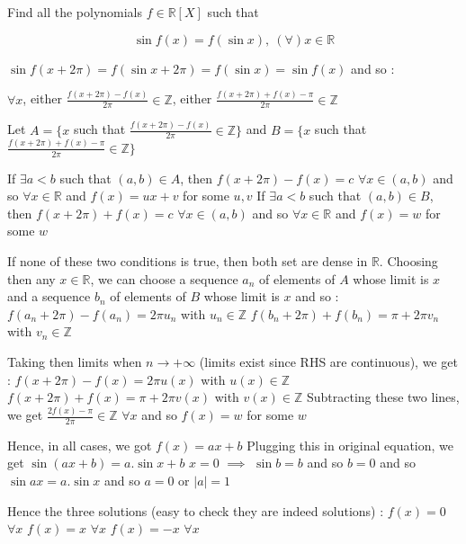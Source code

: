 \begin{solution}
	\begin{tcolorbox}Find all the polynomials $f\in \mathbb{R}[X]$ such that

\[\sin f(x)=f(\sin x),\ (\forall)x\in \mathbb{R}\]\end{tcolorbox}
$\sin f(x+2\pi)=f(\sin x+2\pi)=f(\sin x)=\sin f(x)$ and so :

$\forall x$, either $\frac{f(x+2\pi)-f(x)}{2\pi}\in\mathbb Z$, either $\frac{f(x+2\pi)+f(x)-\pi}{2\pi}\in\mathbb Z$

Let $A=\{x$ such that $\frac{f(x+2\pi)-f(x)}{2\pi}\in\mathbb Z\}$
and $B=\{x$ such that $\frac{f(x+2\pi)+f(x)-\pi}{2\pi}\in\mathbb Z\}$

If $\exists a<b$ such that $(a,b)\in A$, then $f(x+2\pi)-f(x)=c$ $\forall x\in(a,b)$ and so $\forall x\in\mathbb R$ and $f(x)=ux+v$ for some $u,v$
If $\exists a<b$ such that $(a,b)\in B$, then $f(x+2\pi)+f(x)=c$ $\forall x\in(a,b)$ and so $\forall x\in\mathbb R$ and $f(x)=w$ for some $w$

If none of these two conditions is true, then both set are dense in $\mathbb R$.
Choosing then any $x\in\mathbb R$, we can choose a sequence $a_n$ of elements of $A$ whose limit is $x$ and a sequence $b_n$ of elements of $B$ whose limit is $x$ and so :
$f(a_n+2\pi)-f(a_n)=2\pi u_n$ with $u_n\in\mathbb Z$
$f(b_n+2\pi)+f(b_n)=\pi + 2\pi v_n$ with $v_n\in\mathbb Z$

Taking then limits when $n\to +\infty$ (limits exist since RHS are continuous), we get :
$f(x+2\pi)-f(x)=2\pi u(x)$ with $u(x)\in\mathbb Z$
$f(x+2\pi)+f(x)=\pi + 2\pi v(x)$ with $v(x)\in\mathbb Z$
Subtracting these two lines, we get $\frac{2f(x)-\pi}{2\pi}\in\mathbb Z$ $\forall x$ and so $f(x)=w$ for some $w$

Hence, in all cases, we got $f(x)=ax+b$
Plugging this in original equation, we get $\sin(ax+b)=a.\sin x + b$
$x=0$ $\implies$ $\sin b =b$ and so $b=0$ and so $\sin ax=a.\sin x$ and so $a=0$ or $|a|=1$

Hence the three solutions (easy to check they are indeed solutions) :
$f(x)=0$ $\forall x$
$f(x)=x$ $\forall x$
$f(x)=-x$ $\forall x$
\end{solution}






